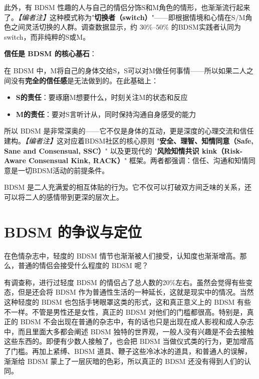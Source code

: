 \documentclass[12pt,UTF8]{ctexbook}
\begin{document}
此外，有 BDSM 性趣的人与自己的情侣分饰S和M角色的情形，也渐渐流行起来了。\textit{【编者注】}这种模式称为"\textbf{切换者（switch）}"——即根据情境和心情在S/M角色之间灵活切换的人群。调查数据显示，约 $30\%$--$50\%$ 的BDSM实践者认同为switch，而非纯粹的S或M。

\noindent\textbf{信任是 BDSM 的核心基石}：

在 BDSM 中，M将自己的身体交给S，S可以对M做任何事情——所以如果二人之间没有\textbf{完全的信任感}是无法做到的。在此基础上：
\begin{itemize}
	\item \textbf{S的责任}：要琢磨M想要什么，时刻关注M的状态和反应
	\item \textbf{M的责任}：要对S言听计从，同时保持沟通自身感受的能力
\end{itemize}

所以 BDSM 是非常深奥的——它不仅是身体的互动，更是深度的心理交流和信任建构。\textit{【编者注】}这对应着BDSM社区的核心原则 "\textbf{安全、理智、知情同意（Safe, Sane and Consensual, SSC）}" 以及更现代的 "\textbf{风险知情共识 kink（Risk-Aware Consensual Kink, RACK）}" 框架。两者都强调：信任、沟通和知情同意是一切BDSM活动的前提条件。

\begin{tcolorbox}[colback=pink!5!white,colframe=red!50!black,title=贴心小叮咛]
BDSM 是二人充满爱的相互体贴的行为。它不仅可以打破双方间乏味的关系，还可以将二人的感情带到更深的层次上。
\end{tcolorbox}

\section{BDSM 的争议与定位}

在色情杂志中，轻度的 BDSM 情节也渐渐被人们接受，认知度也渐渐增高。那么，普通的情侣会接受什么程度的 BDSM 呢？

有调查称，进行过轻度 BDSM 的情侣占了总人数的20\%左右。虽然会觉得有些变态，但是还会将 BDSM 作为普通性生活的一种延长，这就是现实中的情况。当然这种轻度的 BDSM 也包括手铐眼罩这类的形式，这和真正意义上的 BDSM 有些不一样。不管是男性还是女性，真正的 BDSM 对他们的门槛都很高。特别是，真正的 BDSM 不会出现在普通的杂志中，有的话也只是出现在成人影视和成人杂志中，而且里面大多都会阐述 BDSM 独特的世界观，一般人没有兴趣是不会去接触这些东西的。即便有少数人接触了，也会把 BDSM 当做仪式类的行为，更加增高了门槛。再加上紧缚、BDSM 道具、鞭子这些冷冰冰的道具，和普通人的误解，渐渐给 BDSM 蒙上了一层灰暗的色彩，所以真正的 BDSM 还没有得到人们的认同。
\end{document}
